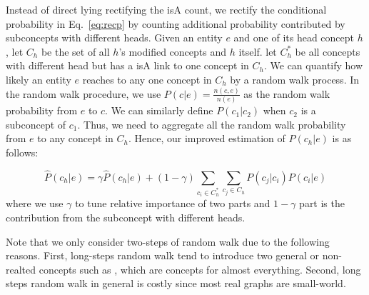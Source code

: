 Instead of direct lying rectifying the isA count, we rectify the conditional probability in Eq.~\ref{eq:recp} by counting additional probability contributed by subconcepts with different heads. Given an entity $e$ and one of its head concept $h$, let $C_h$ be the set of all $h$'s modified concepts and $h$ itself. let $C^*_h$ be all concepts with different head but has a isA link to one concept in $C_h$. We can quantify how likely an entity $e$ reaches to any one concept in $C_h$ by a random walk process. In the random walk procedure, we use $P(c|e)=\frac{n(c,e)}{n(e)}$ as the random walk probability from $e$ to $c$. We can similarly define $P(c_1|c_2)$ when $c_2$ is a subconcept of $c_1$.  Thus, we need to aggregate all the random walk probability from $e$ to any concept in $C_h$.
Hence, our improved estimation of $P({c_h}|e)$ is as follows:

\begin{equation}
\hat{P}({c_h}|e) = \gamma \hat{P}({c_h}|e)+ (1-\gamma) \sum_{c_i\in C^*_h}\sum_{ c_j\in C_h} P(c_j|c_i) P(c_i|e)
\label{eq:pgge}
\end{equation}
where we use $\gamma$ to tune relative importance of two parts and $1-\gamma$ part is the contribution from the subconcept with different heads.


Note that we only consider two-steps of random walk due to the following reasons.
First, long-steps random walk tend to introduce two general or non-realted concepts such as , which are concepts for almost everything.
Second, long steps random walk in general is costly since most real graphs are small-world.

%
%

